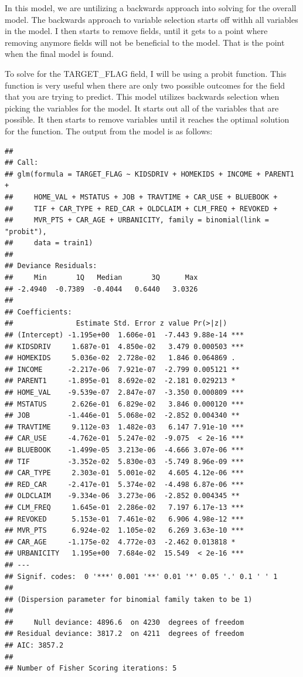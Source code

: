 \documentclass[]{article}
\begin{document}
In this model, we are untilizing a backwards approach into solving for
the overall model. The backwards approach to variable selection starts
off withh all variables in the model. I then starts to remove fields,
until it gets to a point where removing anymore fields will not be
beneficial to the model. That is the point when the final model is
found.

To solve for the TARGET\_FLAG field, I will be using a probit function.
This function is very useful when there are only two possible outcomes
for the field that you are trying to predict. This model utilizes
backwards selection when picking the variables for the model. It starts
out all of the variables that are possible. It then starts to remove
variables until it reaches the optimal solution for the function. The
output from the model is as follows:

\begin{verbatim}
## 
## Call:
## glm(formula = TARGET_FLAG ~ KIDSDRIV + HOMEKIDS + INCOME + PARENT1 + 
##     HOME_VAL + MSTATUS + JOB + TRAVTIME + CAR_USE + BLUEBOOK + 
##     TIF + CAR_TYPE + RED_CAR + OLDCLAIM + CLM_FREQ + REVOKED + 
##     MVR_PTS + CAR_AGE + URBANICITY, family = binomial(link = "probit"), 
##     data = train1)
## 
## Deviance Residuals: 
##     Min       1Q   Median       3Q      Max  
## -2.4940  -0.7389  -0.4044   0.6440   3.0326  
## 
## Coefficients:
##               Estimate Std. Error z value Pr(>|z|)    
## (Intercept) -1.195e+00  1.606e-01  -7.443 9.88e-14 ***
## KIDSDRIV     1.687e-01  4.850e-02   3.479 0.000503 ***
## HOMEKIDS     5.036e-02  2.728e-02   1.846 0.064869 .  
## INCOME      -2.217e-06  7.921e-07  -2.799 0.005121 ** 
## PARENT1     -1.895e-01  8.692e-02  -2.181 0.029213 *  
## HOME_VAL    -9.539e-07  2.847e-07  -3.350 0.000809 ***
## MSTATUS      2.626e-01  6.829e-02   3.846 0.000120 ***
## JOB         -1.446e-01  5.068e-02  -2.852 0.004340 ** 
## TRAVTIME     9.112e-03  1.482e-03   6.147 7.91e-10 ***
## CAR_USE     -4.762e-01  5.247e-02  -9.075  < 2e-16 ***
## BLUEBOOK    -1.499e-05  3.213e-06  -4.666 3.07e-06 ***
## TIF         -3.352e-02  5.830e-03  -5.749 8.96e-09 ***
## CAR_TYPE     2.303e-01  5.001e-02   4.605 4.12e-06 ***
## RED_CAR     -2.417e-01  5.374e-02  -4.498 6.87e-06 ***
## OLDCLAIM    -9.334e-06  3.273e-06  -2.852 0.004345 ** 
## CLM_FREQ     1.645e-01  2.286e-02   7.197 6.17e-13 ***
## REVOKED      5.153e-01  7.461e-02   6.906 4.98e-12 ***
## MVR_PTS      6.924e-02  1.105e-02   6.269 3.63e-10 ***
## CAR_AGE     -1.175e-02  4.772e-03  -2.462 0.013818 *  
## URBANICITY   1.195e+00  7.684e-02  15.549  < 2e-16 ***
## ---
## Signif. codes:  0 '***' 0.001 '**' 0.01 '*' 0.05 '.' 0.1 ' ' 1
## 
## (Dispersion parameter for binomial family taken to be 1)
## 
##     Null deviance: 4896.6  on 4230  degrees of freedom
## Residual deviance: 3817.2  on 4211  degrees of freedom
## AIC: 3857.2
## 
## Number of Fisher Scoring iterations: 5
\end{verbatim}
\end{document}
